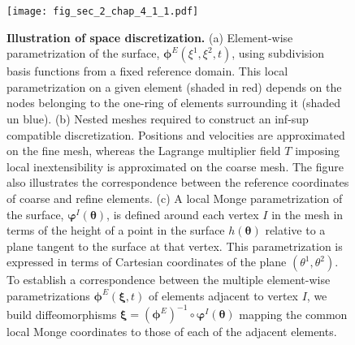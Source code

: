 \begin{figure}
	\centering
	\hspace*{-0.5cm}\texttt{[image: fig\_sec\_2\_chap\_4\_1\_1.pdf]}
	\caption{\textbf{Illustration of space discretization.}  (a) Element-wise parametrization of the surface, $\bm{\phi}^E(\xi^1, \xi^2, t)$, using subdivision basis functions from a fixed reference domain. This local parametrization on a given element (shaded in red) depends on the nodes belonging to the one-ring of elements surrounding it (shaded un blue). (b) Nested meshes required to construct an inf-sup compatible discretization. Positions and velocities are approximated on the fine mesh, whereas the Lagrange multiplier field $T$ imposing local inextensibility is approximated on the coarse mesh. The figure also illustrates the correspondence between the reference coordinates of coarse and refine elements. (c) A local Monge parametrization of the surface, $\bm{\varphi}^I(\bm{\theta})$, is defined around each vertex $I$ in the mesh in terms of the height of a point in the surface $h(\bm{\theta})$ relative to a plane tangent to the surface at that vertex. This parametrization is expressed in terms of Cartesian coordinates of the plane $(\theta^1, \theta^2)$. To establish a correspondence between the multiple element-wise parametrizations $\bm{\phi}^E(\bm{\xi},t)$ of elements adjacent to vertex $I$, we build diffeomorphisms $\bm{\xi} = (\bm{\phi}^E)^{-1} \circ \bm{\varphi}^I (\bm{\theta})$ mapping the common local Monge coordinates to those of each of the adjacent elements.} 	%
	\label{fig_1}
\end{figure} 


